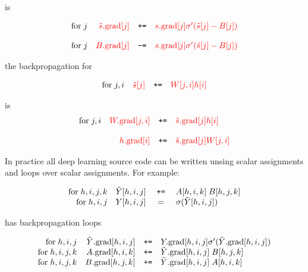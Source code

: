 {\vfill
is

\vfill
$$\begin{array}{lrcl}
\mathrm{for}\;j & {\color{red} \tilde{s}.\mathrm{grad}[j]} & \mbox{\tt +=} & {\color{red} s.\mathrm{grad}[j]\sigma'(\tilde{s}[j] - B[j])} \\
\\
\mathrm{for}\;j & {\color{red} B.\mathrm{grad}[j]} & \mbox{\tt -=} & {\color{red} s.\mathrm{grad}[j]\sigma'(\tilde{s}[j] - B[j])}
\end{array}$$

the backpropagation for

$$\begin{array}{lrcl}
\mathrm{for}\;j,i & {\color{red} \tilde{s}[j]} & \mbox{\tt +=} & {\color{red} W[j,i]h[i]}
\end{array}$$

\vfill
is
$$\begin{array}{lrcl}
\mathrm{for}\;j,i & {\color{red} W.\mathrm{grad}[j,i]} & \mbox{\tt +=} & {\color{red} \tilde{s}.\mathrm{grad}[j] h[i]} \\
\\
& {\color{red} h.\mathrm{grad}[i]} & \mbox{\tt +=} & {\color{red} \tilde{s}.\mathrm{grad}[j] W[j,i]} \\
\end{array}$$


In practice all deep learning source code can be written unsing scalar assignments and loops over scalar assignments.
For example:

$$\begin{array}{rrcl}
\mathrm{for}\; h,i,j,k & \tilde{Y}[h,i,j] & \;\mbox{\tt +=}\; & A[h,i,k]\;B[h,j,k] \\
\mathrm{for}\; h,i,j & Y[h,i,j] & = & \sigma(\tilde{Y}[h,i,j])
\end{array}$$

\vfill
has backpropagation loops

$$\begin{array}{rrcl}
\mathrm{for}\;h,i,j & \tilde{Y}.\mathrm{grad}[h,i,j] & \mbox{\tt +=} & Y.\mathrm{grad}[h,i,j]\sigma'(\tilde{Y}.\mathrm{grad}[h,i,j]) \\
\mathrm{for}\;h,i,j,k & A.\mathrm{grad}[h,i,k] & \mbox{\tt +=} & \tilde{Y}.\mathrm{grad}[h,i,j] \;B[h,j,k] \\
\mathrm{for}\;h,i,j,k & B.\mathrm{grad}[h,j,k] & \mbox{\tt +=} & \tilde{Y}.\mathrm{grad}[h,i,j]\;A[h,i,k]
\end{array}$$

}


